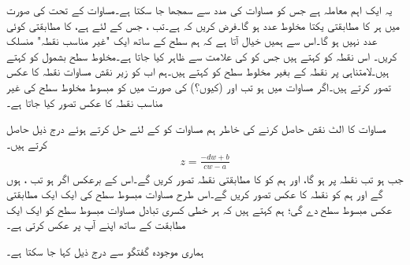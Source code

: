  یہ ایک اہم معاملہ ہے جس کو مساوات  کی مدد سے  سمجھا جا سکتا ہے۔مساوات  کے تحت  کی صورت میں ہر  کا مطابقتی یکتا مخلوط عدد  ہو گا۔فرض کریں کہ  ہے۔تب ، جس کے لئے  ہے، کا مطابقتی کوئی عدد  نہیں ہو گا۔اس سے ہمیں خیال آتا ہے کہ ہم  سطح کے ساتھ ایک "غیر مناسب نقطہ" منسلک کریں۔ اس نقطہ کو  کہتے ہیں جس کو  کی علامت سے ظاہر کیا جاتا ہے۔مخلوط سطح بشمول  کو  کہتے ہیں۔لامتناہی پر نقطہ کے بغیر مخلوط سطح کو  کہتے ہیں۔ہم اب  کو زیر نقش مساوات  نقطہ  کا عکس تصور کرتے ہیں۔اگر مساوات  میں  ہو تب  اور  (کیوں؟) کی صورت میں   کو مبسوط مخلوط  سطح کی غیر مناسب نقطہ   کا عکس تصور کیا جاتا ہے۔

مساوات  کا الٹ نقش حاصل کرنے کی خاطر ہم مساوات  کو  کے لئے حل کرتے  ہوئے درج ذیل حاصل کرتے ہیں۔
\begin{align}
z=\frac{-dw+b}{cw-a}
\end{align}
جب  ہو تب  نقطہ  پر ہو گا، اور ہم   کو  کا مطابقتی نقطہ تصور کریں گے۔اس کے برعکس اگر  ہو تب  ،  ہوں گے اور ہم  کو نقطہ  کا عکس تصور کریں گے۔اس طرح مساوات  مبسوط  سطح کی ایک ایک مطابقتی عکس مبسوط  سطح دے گی؛ ہم کہتے ہیں کہ ہر خطی کسری تبادل مساوات  مبسوط سطح کو ایک ایک مطابقت کے ساتھ اپنے آپ پر عکس کرتی ہے۔

ہماری موجودہ گفتگو سے درج ذیل کہا جا سکتا ہے۔

